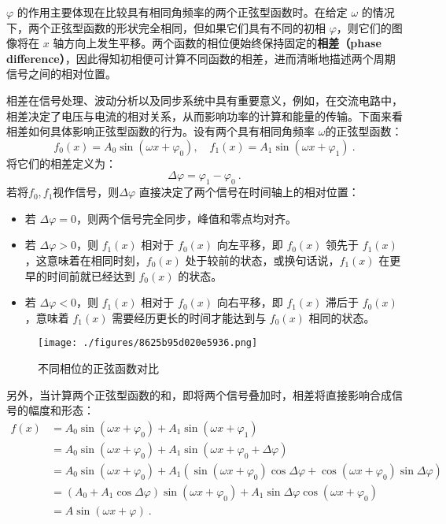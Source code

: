 $\varphi$ 的作用主要体现在比较具有相同角频率的两个正弦型函数时。在给定 $\omega$ 的情况下，两个正弦型函数的形状完全相同，但如果它们具有不同的初相 $\varphi$，则它们的图像将在 $x$ 轴方向上发生平移。两个函数的相位便始终保持固定的\textbf{相差（phase difference）}，因此得知初相便可计算不同函数的相差，进而清晰地描述两个周期信号之间的相对位置。

相差在信号处理、波动分析以及同步系统中具有重要意义，例如，在交流电路中，相差决定了电压与电流的相对关系，从而影响功率的计算和能量的传输。下面来看相差如何具体影响正弦型函数的行为。设有两个具有相同角频率 $\omega$的正弦型函数：
\begin{equation}
f_0\left(x\right)=A_0\sin\left(\omega x+\varphi_0\right),\quad f_1\left(x\right)=A_1\sin\left(\omega x+\varphi_1\right)~.
\end{equation}
将它们的相差定义为：
\begin{equation}
\Delta \varphi = \varphi_1 - \varphi_0~.
\end{equation}
若将$f_0,f_1$视作信号，则$\Delta \varphi$ 直接决定了两个信号在时间轴上的相对位置：
\begin{itemize}
\item 若 $\Delta \varphi = 0$，则两个信号完全同步，峰值和零点均对齐。
\item 若 $\Delta \varphi > 0$，则 $f_1(x)$ 相对于 $f_0(x)$ 向左平移，即 $f_0(x)$ 领先于 $f_1(x)$，这意味着在相同时刻，$f_0(x)$ 处于较前的状态，或换句话说，$f_1(x)$ 在更早的时间前就已经达到 $f_0(x)$ 的状态。
\item 若 $\Delta \varphi < 0$，则 $f_1(x)$ 相对于 $f_0(x)$ 向右平移，即 $f_1(x)$ 滞后于 $f_0(x)$，意味着 $f_1(x)$ 需要经历更长的时间才能达到与 $f_0(x)$ 相同的状态。
\end{itemize}
\begin{figure}[ht]
\centering
\texttt{[image: ./figures/8625b95d020e5936.png]}
\caption{不同相位的正弦函数对比} \label{fig_HsSinF_2}
\end{figure}
另外，当计算两个正弦型函数的和，即将两个信号叠加时，相差将直接影响合成信号的幅度和形态：
\begin{equation}\label{eq_HsSinF_3}
\begin{split}
f(x) &= A_0\sin(\omega x + \varphi_0) + A_1\sin(\omega x + \varphi_1) \\
&= A_0\sin(\omega x + \varphi_0) + A_1\sin(\omega x + \varphi_0 + \Delta \varphi)\\
&= A_0\sin(\omega x + \varphi_0) + A_1 \left( \sin(\omega x + \varphi_0) \cos \Delta \varphi + \cos(\omega x + \varphi_0) \sin \Delta \varphi \right) \\
&= (A_0 + A_1 \cos \Delta \varphi) \sin(\omega x + \varphi_0) + A_1 \sin \Delta \varphi\cos(\omega x + \varphi_0)\\
&= A \sin(\omega x + \varphi)~.
\end{split}
\end{equation}

